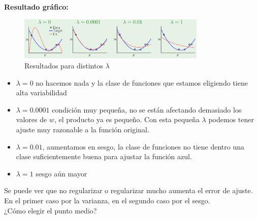\documentclass[11pt,a4paper]{article}
\theoremstyle{definition}
\begin{document}
	\textbf{Resultado gráfico:}
	\begin{figure}[H]
		\centering
		\includegraphics[width=0.8\textwidth]{images/reg_lin_wd}
		\caption{Resultados para distintos $\lambda$ }
	\end{figure}
	\begin{itemize}
		\item $\lambda=0$ no hacemos nada y la clase de funciones que estamos eligiendo tiene alta variabilidad
		\item $\lambda=0.0001$ condición muy pequeña, no se están afectando demasiado los valores de $w$, el producto ya es pequeño. Con esta pequeña $\lambda$ podemos tener ajuste muy razonable a la función original.
		\item $\lambda=0.01$, aumentamos en sesgo, la clase de funciones no tiene dentro una clase suficientemente buena para ajustar la función azul.
		\item $\lambda=1$ sesgo aún mayor
	\end{itemize}
	Se puede ver que no regularizar o regularizar mucho aumenta el error de ajuste. En el primer caso por la varianza, en el segundo caso por el sesgo.\\
	
	¿Cómo elegir el punto medio?
\end{document}

